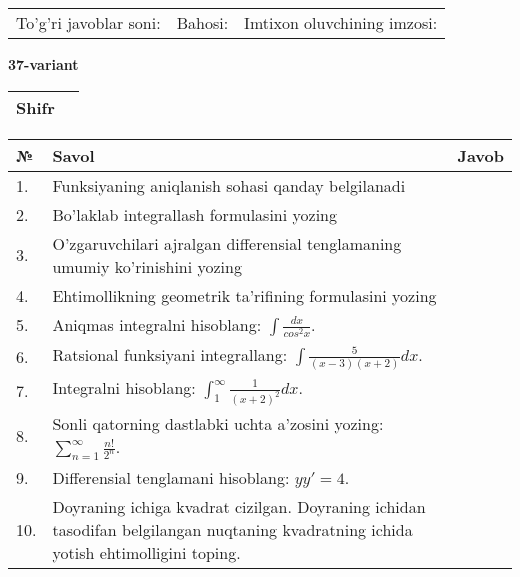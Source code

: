 \documentclass{article}
\begin{document}
  \vspace{1cm}
  
  \begin{tabular}{lll}
  To'g'ri javoblar soni: \underline{\hspace{1.5cm}} & 
  Bahosi: \underline{\hspace{1.5cm}} & 
  Imtixon oluvchining imzosi: \underline{\hspace{2cm}} \\
  \end{tabular}
  
  \egroup
  
  \newpage
  
  
  \textbf{37-variant}\\
  
  \bgroup
  \def\arraystretch{1.6} %
  
  \begin{tabular}{|m{5.7cm}|m{9.5cm}|}
  \hline
  Shifr & \\
  \hline
  \end{tabular}
  
  \vspace{1cm}
  
  \begin{tabular}{|m{0.7cm}|m{10cm}|m{4cm}|}
  \hline
  № & Savol & Javob \\
  \hline
  1. & Funksiyaning aniqlanish sohasi qanday belgilanadi &  \\
  \hline
  2. & Bo'laklab integrallash formulasini yozing &  \\
  \hline
  3. & O'zgaruvchilari ajralgan differensial tenglamaning umumiy ko'rinishini yozing &  \\
  \hline
  4. & Ehtimollikning geometrik ta'rifining formulasini yozing &  \\
  \hline
  5. & Aniqmas integralni hisoblang: \(\int \frac{dx}{cos^{2}x}\). &  \\
  \hline
  6. & Ratsional funksiyani integrallang: \(\int {\frac{5}{(x - 3)(x + 2)}dx}\). &  \\
  \hline
  7. & Integralni hisoblang: \(\int_{1}^{\infty}{\frac{1}{(x + 2)^{2}}dx}\). &  \\
  \hline
  8. & Sonli qatorning dastlabki uchta a'zosini yozing: \(\sum_{n = 1}^{\infty}\frac{n!}{2^{n}}\). &  \\
  \hline
  9. & Differensial tenglamani hisoblang: \(yy' = 4\). &  \\
  \hline
  10. & Doyraning ichiga kvadrat cizilgan. Doyraning ichidan tasodifan belgilangan nuqtaning kvadratning ichida yotish ehtimolligini toping. &  \\
  \hline
  \end{tabular}
  
\end{document}
